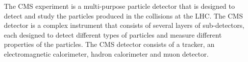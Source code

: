 The CMS experiment is a multi-purpose particle detector that is designed to detect and study the particles produced in the collisions at the LHC. The CMS detector is a complex instrument that consists of several layers of sub-detectors, each designed to detect different types of particles and measure different properties of the particles. The CMS detector consists of a tracker, an electromagnetic calorimeter, hadron calorimeter and muon detector. 

\begin{itemize}





\end{itemize}
